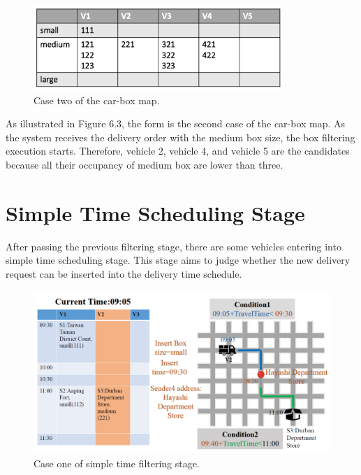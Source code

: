 \documentclass[12pt]{ksthesis}
\begin{document}
\begin{thesis}
{\begin{figure}[t]
\centering
\includegraphics[width=0.85\textwidth]{./Thesis_figures/F6-3_caseTwo_boxFiltering.PNG}
\caption{\large Case two of the car-box map.}
\vspace{0.5cm}
\label{Fig:CaseTwo_carBox_Map}
\end{figure}

As illustrated in Figure 6.3, the form is the second case of the car-box map. As the system receives the delivery order with the medium box size, the box filtering execution starts. Therefore, vehicle 2, vehicle 4, and vehicle 5 are the candidates because all their occupancy of medium box are lower than three.

\section{Simple Time Scheduling Stage}

After passing the previous filtering stage, there are some vehicles entering into simple time scheduling stage. This stage aims to judge whether the new delivery request can be inserted into the delivery time schedule.

\begin{figure}[H]
\centering
\includegraphics[width=1.14\textwidth]{./Thesis_figures/F6-4_caseOne_SchedulingStage.PNG}
\caption{\large Case one of simple time filtering stage.}
\vspace{0.5cm}
\label{Fig:CaseOne_TimeFiltering}
\end{figure}

}
\end{thesis}
\end{document}
